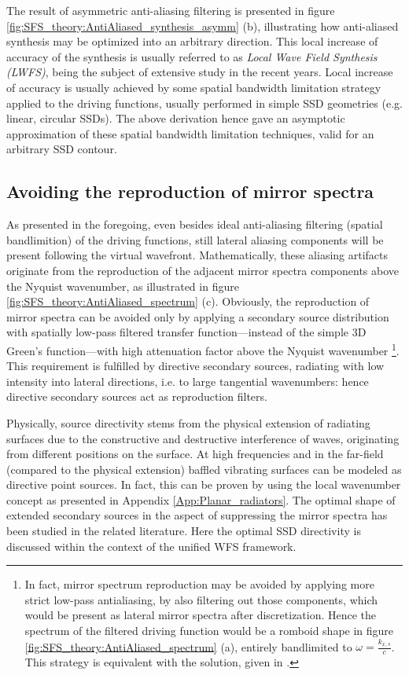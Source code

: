 The result of asymmetric anti-aliasing filtering is presented in figure \ref{fig:SFS_theory:AntiAliased_synthesis_asymm} (b), illustrating how anti-aliased synthesis may be optimized into an arbitrary direction.
This local increase of accuracy of the synthesis is usually referred to as \emph{Local Wave Field Synthesis (LWFS)}, being the subject of extensive study in the recent years.
Local increase of accuracy is usually achieved by some spatial bandwidth limitation strategy applied to the driving functions, usually performed in simple SSD geometries (e.g. linear, circular SSDs).
The above derivation hence gave an asymptotic approximation of these spatial bandwidth limitation techniques, valid for an arbitrary SSD contour.

\subsection{Avoiding the reproduction of mirror spectra}

As presented in the foregoing, even besides ideal anti-aliasing filtering (spatial bandlimition) of the driving functions, still lateral aliasing components will be present following the virtual wavefront.
Mathematically, these aliasing artifacts originate from the reproduction of the adjacent mirror spectra components above the Nyquist wavenumber, as illustrated in figure \ref{fig:SFS_theory:AntiAliased_spectrum} (c).
Obviously, the reproduction of mirror spectra can be avoided only by applying a secondary source distribution with spatially low-pass filtered transfer function---instead of the simple 3D Green's function---with high attenuation factor above the Nyquist wavenumber \footnote{In fact, mirror spectrum reproduction may be avoided by applying more strict low-pass antialiasing, by also filtering out those components, which would be present as lateral mirror spectra after discretization. 
Hence the spectrum of the filtered driving function would be a romboid shape in figure \ref{fig:SFS_theory:AntiAliased_spectrum}  (a), entirely bandlimited to $\omega = \frac{k_{x,s}}{c}$.
This strategy is equivalent with the solution, given in \cite{Winter2018:GeometricModel}.}.
This requirement is fulfilled by directive secondary sources, radiating with low intensity into lateral directions, i.e. to large tangential wavenumbers: hence directive secondary sources act as reproduction filters.

Physically, source directivity stems from the physical extension of radiating surfaces due to the constructive and destructive interference of waves, originating from different positions on the surface.
At high frequencies and in the far-field (compared to the physical extension) baffled vibrating surfaces can be modeled as directive point sources.
In fact, this can be proven by using the local wavenumber concept as presented in Appendix \ref{App:Planar_radiators}.
The optimal shape of extended secondary sources in the aspect of suppressing the mirror spectra has been studied in the related literature.
Here the optimal SSD directivity is discussed within the context of the unified WFS framework.

